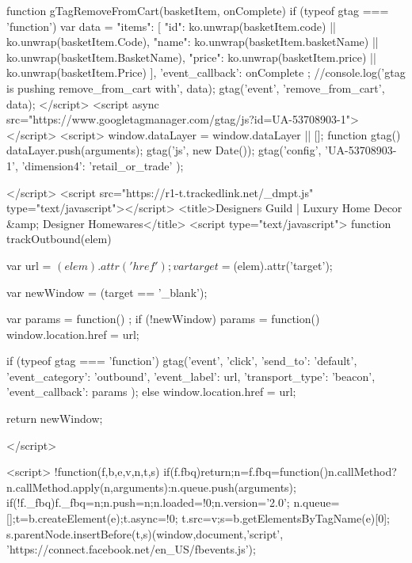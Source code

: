     function gTagRemoveFromCart(basketItem, onComplete) {
        if (typeof gtag === 'function') {
            var data = {
                "items": [{
                    "id": ko.unwrap(basketItem.code) || ko.unwrap(basketItem.Code),
                    "name": ko.unwrap(basketItem.basketName) || ko.unwrap(basketItem.BasketName),
                    "price": ko.unwrap(basketItem.price) || ko.unwrap(basketItem.Price)
                }],
                'event_callback': onComplete
            };
            //console.log('gtag is pushing remove_from_cart with', data);
            gtag('event', 'remove_from_cart', data);
        }
    }
</script>
<script async src="https://www.googletagmanager.com/gtag/js?id=UA-53708903-1"></script>
<script>
        window.dataLayer = window.dataLayer || [];
        function gtag() { dataLayer.push(arguments); }
        gtag('js', new Date());
        gtag('config', 'UA-53708903-1', {
            'dimension4': 'retail_or_trade'
        });

                    </script>
<script src="https://r1-t.trackedlink.net/_dmpt.js" type="text/javascript"></script>
<title>Designers Guild | Luxury Home Decor &amp; Designer Homewares</title>
<script type="text/javascript">
            function trackOutbound(elem) {
                var url = $(elem).attr('href');
                var target = $(elem).attr('target');

                var newWindow = (target == '_blank');

                var params = function() { };
                if (!newWindow) {
                    params = function() {
                        window.location.href = url;
                    }
                }

                if (typeof gtag === 'function') {
                    gtag('event', 'click', {
                        'send_to': 'default',
                        'event_category': 'outbound',
                        'event_label': url,
                        'transport_type': 'beacon',
                        'event_callback': params
                    });
                } else {
                    window.location.href = url;
                }

                return newWindow;
            }
        </script>

<script>
            !function(f,b,e,v,n,t,s)
            {if(f.fbq)return;n=f.fbq=function(){n.callMethod?
            n.callMethod.apply(n,arguments):n.queue.push(arguments)};
                if(!f._fbq)f._fbq=n;n.push=n;n.loaded=!0;n.version='2.0';
                n.queue=[];t=b.createElement(e);t.async=!0;
                t.src=v;s=b.getElementsByTagName(e)[0];
                s.parentNode.insertBefore(t,s)}(window,document,'script',
                    'https://connect.facebook.net/en_US/fbevents.js');

